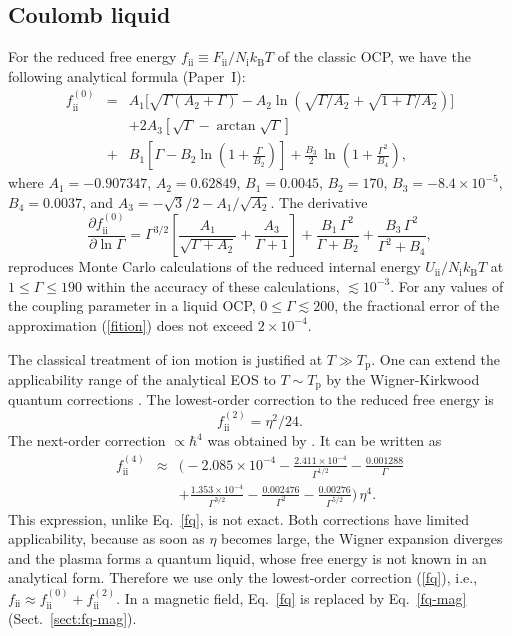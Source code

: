 \documentclass[traditabstract]{aa}
\newcommand{\beq}{\begin{equation}}
\newcommand{\eeq}{\end{equation}}
\newcommand{\bea}{\begin{eqnarray}}
\newcommand{\eea}{\end{eqnarray}}
\newcommand{\req}[1]{Eq.~\ref{#1}}
\newcommand{\Nion}{N_\mathrm{i}}
\newcommand{\kB}{k_\mathrm{B}}
\newcommand{\Tp}{T_\mathrm{p}}
\begin{document}
\subsection{Coulomb liquid}
\label{sect:OCPliq}

For the reduced free energy
$f_\mathrm{ii}\equiv {F_\mathrm{ii}}/{\Nion\kB T}$ of the
classic OCP, we have the following analytical formula
(Paper~I):
\bea
  f_\mathrm{ii}^{(0)} %
   &= &
   A_1\Big[\sqrt{\Gamma(A_2+\Gamma)}
           - A_2 \ln\!\left(\sqrt{\Gamma/ A_2}
           +\sqrt{1+\Gamma/ A_2}\right)\Big]
 \nonumber\\&&
          + 2A_3\left[\sqrt{\Gamma}
           -\arctan\sqrt{\Gamma} \right]
\nonumber\\
         &+& \!\!\! B_1\left[\Gamma 
         - B_2\ln\left(1+\frac{\Gamma}{ B_2}\right)\right]
 +\frac{B_3}{2}\,\ln\left(1+\frac{\Gamma^2}{ B_4}\right),
\label{fition}
\eea
where $A_1=-0.907347$, $A_2=0.62849$, $B_1=0.0045$, $B_2=170$,
$B_3=-8.4\times10^{-5}$, $B_4=0.0037$, and
$A_3=-\sqrt{3}/2-A_1/\sqrt{A_2}$.
The derivative
\beq
      \frac{\partial f_\mathrm{ii}^{(0)}}{\partial\ln\Gamma}
         = \Gamma^{3/2}
   \left[\frac{A_1}{\sqrt{\Gamma+A_2}} 
   + \frac{A_3}{\Gamma+1}\right]
      + \frac{B_1\,\Gamma^2 }{\Gamma+B_2}
      + \frac{B_3\,\Gamma^2 }{\Gamma^2+B_4},
\eeq
reproduces Monte Carlo
calculations of the reduced internal energy
${U_\mathrm{ii}}/{\Nion \kB T}$
at $1\leq\Gamma\leq190$ \citep{Caillol} within the accuracy
of these calculations, $\lesssim10^{-3}$. For any values of
the coupling parameter in a liquid OCP,
$0\leqslant\Gamma\lesssim200$, the 
fractional error of the approximation (\ref{fition})
does not exceed $2\times10^{-4}$.

The classical treatment of ion motion is justified at
$T\gg\Tp$. One can extend the applicability range of the
analytical EOS to $T\sim\Tp$ by
the Wigner-Kirkwood quantum corrections
\citep{Wigner32,LaLi-SP1}.
The lowest-order correction to the reduced free energy
is
\beq
   f_\mathrm{ii}^{(2)}=\eta^2/24.
\label{fq}
\eeq
The next-order correction
$\propto\hbar^4$ was obtained by \citet{HV75}.
It can be written as
\bea
   f_\mathrm{ii}^{(4)} &\approx&
    \bigg(\!-2.085\times10^{-4} - \frac{2.411\times10^{-4}}{\Gamma^{1/2}}
    - \frac{0.001288}{\Gamma}
\nonumber\\&&
    +\frac{1.353\times10^{-4}}{\Gamma^{3/2}}
    - \frac{0.002476}{\Gamma^2}-\frac{0.00276}{\Gamma^{5/2}}\bigg)
    \,\eta^4.
\label{WK4}
\eea
This expression, unlike \req{fq}, is not exact.
Both corrections have
limited applicability, because as soon as $\eta$ becomes large,
the Wigner expansion diverges and
the plasma forms a quantum liquid, whose free energy
is not known in an analytical form. Therefore we use
only the lowest-order correction (\ref{fq}),
 i.e., $f_\mathrm{ii}\approx
f_\mathrm{ii}^{(0)}+f_\mathrm{ii}^{(2)}$.
In a magnetic field, \req{fq} is replaced by \req{fq-mag}
(Sect.~\ref{sect:fq-mag}).
\end{document}
